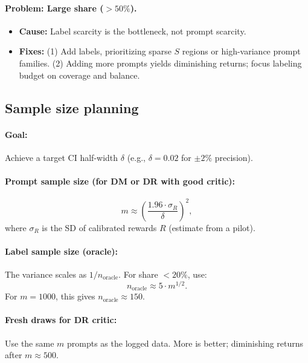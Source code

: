 \paragraph{Problem: Large \oua{} share ($> 50\%$).}
\begin{itemize}
\item \textbf{Cause:} Label scarcity is the bottleneck, not prompt scarcity.
\item \textbf{Fixes:} (1) Add labels, prioritizing sparse $S$ regions or high-variance prompt families. (2) Adding more prompts yields diminishing returns; focus labeling budget on coverage and balance.
\end{itemize}

\subsection{Sample size planning}

\paragraph{Goal:} Achieve a target CI half-width $\delta$ (e.g., $\delta = 0.02$ for $\pm 2\%$ precision).

\paragraph{Prompt sample size (for DM or DR with good critic):}
\begin{equation}
m \approx \left( \frac{1.96 \cdot \sigma_R}{\delta} \right)^2,
\end{equation}
where $\sigma_R$ is the SD of calibrated rewards $R$ (estimate from a pilot).

\paragraph{Label sample size (oracle):}
The \oua{} variance scales as $1 / n_{\text{oracle}}$. For \oua{} share $< 20\%$, use:
\begin{equation}
n_{\text{oracle}} \approx 5 \cdot m^{1/2}.
\end{equation}
For $m = 1000$, this gives $n_{\text{oracle}} \approx 150$.

\paragraph{Fresh draws for DR critic:}
Use the same $m$ prompts as the logged data. More is better; diminishing returns after $m \approx 500$.

